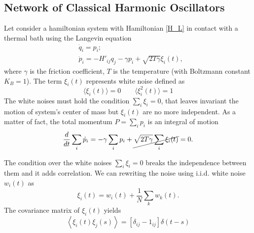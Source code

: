 \subsection{Network of Classical Harmonic Oscillators}

Let consider a hamiltonian system with Hamiltonian \eqref{H_L} in contact with a thermal bath using the Langevin equation
\begin{equation}
    \begin{aligned}
        &\dot q_i = p_i; \\
        &\dot p_i  = -H'_{ij}q_j - \gamma p_i + \sqrt{2T\gamma}\xi_i(t),
    \end{aligned}
\end{equation}
where $\gamma$ is the friction coefficient, $T$ is the temperature (with Boltzmann constant $K_B =1$). The term $\xi_i(t)$ represents white noise defined as
\begin{equation}\label{white_noise}
    \langle\xi_i(t)\rangle = 0 \qquad \langle\xi_i^2(t)\rangle = 1 
\end{equation}
The white noises must hold the condition $\sum_i \xi_i = 0$, that leaves invariant the motion of  system's center of mass but $\xi_i(t)$ are no more independent.
As a matter of fact, the total momentum $P = \sum_i p_i$ is an integral of motion
\begin{equation}
    \frac{d}{dt} \sum_i \dot p_i = - \gamma \sum_{i}p_i + \cancel{\sqrt{2T\gamma}\sum_i\xi_i(t)} = 0.
\end{equation}

The condition over the white noises $\sum_i \xi_i = 0$ breaks the independence between them and it adds correlation.
We can rewriting the noise using i.i.d. white noise $w_i(t)$ as
\begin{equation}
    \xi_i(t) = w_i (t) + \frac{1}{N} \sum_k w_k(t).
\end{equation}
The covariance matrix of $\xi_i(t)$ yields
\begin{equation}
    \left<\xi_i(t)\xi_j(s)\right> = \left[\delta_{ij} - 1_{ij}\right]\delta(t-s)
\end{equation}

